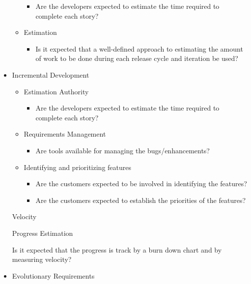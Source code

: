 \begin{itemize}
\begin{itemize}
				\begin{itemize}
					\item Are the developers expected to estimate the time required to complete each story?
				\end{itemize}
			\item Estimation
				\begin{itemize}
					\item Is it expected that a well-defined approach to estimating the amount of work to be done during each release cycle and iteration be used?
				\end{itemize}
		\end{itemize}
	\item Incremental Development
		\begin{itemize}
			\item Estimation Authority
				\begin{itemize}
					\item Are the developers expected to estimate the time required to complete each story?
				\end{itemize}
			\item Requirements Management
				\begin{itemize}
					\item Are tools available for managing the bugs/enhancements?
				\end{itemize}
			\item Identifying and prioritizing features
				\begin{itemize}
					\item Are the customers expected to be involved in identifying the features?
					\item Are the customers expected to establish the priorities of the features?
				\end{itemize}
		\end{itemize}
	\strategyAddition Velocity
		\begin{itemize}
			\indicatorAddition Progress Estimation
				\begin{itemize}
					\addition Is it expected that the progress is track by a burn down chart and by measuring velocity?
				\end{itemize}
		\end{itemize}
	\item Evolutionary Requirements

\end{itemize}
